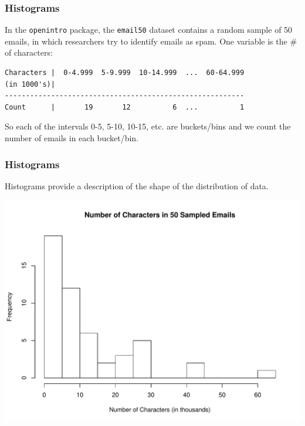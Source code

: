 \documentclass[handout]{beamer}
\newcommand{\blue}[1]{\textcolor{blue2}{#1}}
\begin{document}
\begin{frame}[fragile]
\frametitle{Histograms}
In the {\tt openintro} package, the {\tt email50} dataset contains a random sample of 50 emails, in which researchers try to identify emails as spam.  One variable is the \# of characters:

\vspace{0.25cm}

\begin{tiny}
\begin{verbatim}
Characters |  0-4.999  5-9.999  10-14.999  ...  60-64.999
(in 1000's)|
---------------------------------------------------------
Count      |       19       12          6  ...          1
\end{verbatim}
\end{tiny}

\vspace{0.25cm}

\pause So each of the intervals 0-5, 5-10, 10-15, etc. are \blue{buckets/bins} and we count the number of emails in each bucket/bin.  

\end{frame}



\begin{frame}[fragile]
\frametitle{Histograms}

Histograms provide a description of the shape of the \blue{distribution} of data.  

\begin{center}
\includegraphics[height=0.7\textheight]{figure/hist.pdf}
\end{center}

\end{frame}
\end{document}
